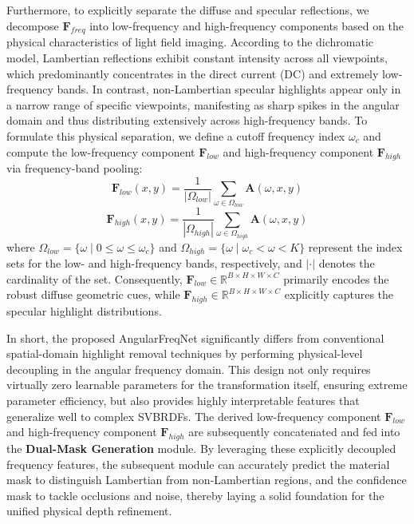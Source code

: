 Furthermore, to explicitly separate the diffuse and specular reflections, we decompose $\mathbf{F}_{freq}$ into low-frequency and high-frequency components based on the physical characteristics of light field imaging. According to the dichromatic model, Lambertian reflections exhibit constant intensity across all viewpoints, which predominantly concentrates in the direct current (DC) and extremely low-frequency bands. In contrast, non-Lambertian specular highlights appear only in a narrow range of specific viewpoints, manifesting as sharp spikes in the angular domain and thus distributing extensively across high-frequency bands. To formulate this physical separation, we define a cutoff frequency index $\omega_c$ and compute the low-frequency component $\mathbf{F}_{low}$ and high-frequency component $\mathbf{F}_{high}$ via frequency-band pooling:
\begin{equation}
\label{eq:eq34}
\mathbf{F}_{low}(x, y) = \frac{1}{|\Omega_{low}|} \sum_{\omega \in \Omega_{low}} \mathbf{A}(\omega, x, y)
\end{equation}
\begin{equation}
\label{eq:eq35}
\mathbf{F}_{high}(x, y) = \frac{1}{|\Omega_{high}|} \sum_{\omega \in \Omega_{high}} \mathbf{A}(\omega, x, y)
\end{equation}
where $\Omega_{low} = \{\omega \mid 0 \le \omega \le \omega_c\}$ and $\Omega_{high} = \{\omega \mid \omega_c < \omega < K\}$ represent the index sets for the low- and high-frequency bands, respectively, and $|\cdot|$ denotes the cardinality of the set. Consequently, $\mathbf{F}_{low} \in \mathbb{R}^{B \times H \times W \times C}$ primarily encodes the robust diffuse geometric cues, while $\mathbf{F}_{high} \in \mathbb{R}^{B \times H \times W \times C}$ explicitly captures the specular highlight distributions.

In short, the proposed AngularFreqNet significantly differs from conventional spatial-domain highlight removal techniques by performing physical-level decoupling in the angular frequency domain. This design not only requires virtually zero learnable parameters for the transformation itself, ensuring extreme parameter efficiency, but also provides highly interpretable features that generalize well to complex SVBRDFs. The derived low-frequency component $\mathbf{F}_{low}$ and high-frequency component $\mathbf{F}_{high}$ are subsequently concatenated and fed into the \textbf{Dual-Mask Generation} module. By leveraging these explicitly decoupled frequency features, the subsequent module can accurately predict the material mask to distinguish Lambertian from non-Lambertian regions, and the confidence mask to tackle occlusions and noise, thereby laying a solid foundation for the unified physical depth refinement.

